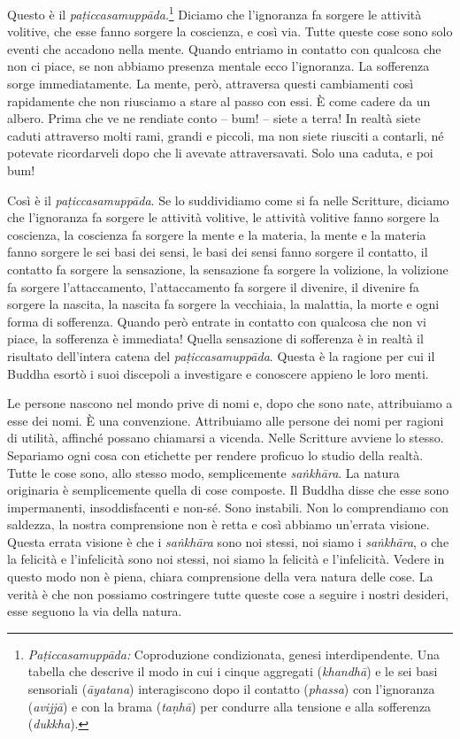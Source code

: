 Questo è il \emph{paṭiccasamuppāda}.\footnote{%
  \emph{Paṭiccasamuppāda:}
  Coproduzione condizionata, genesi interdipendente. Una tabella che
  descrive il modo in cui i cinque aggregati (\emph{khandhā}) e le sei
  basi sensoriali (\emph{āyatana}) interagiscono dopo il contatto
  (\emph{phassa}) con l'ignoranza (\emph{avijjā}) e con la brama
  (\emph{taṇhā}) per condurre alla tensione e alla sofferenza
  (\emph{dukkha}).}
Diciamo che l'ignoranza fa sorgere le attività
volitive, che esse fanno sorgere la coscienza, e così via. Tutte queste
cose sono solo eventi che accadono nella mente. Quando entriamo in
contatto con qualcosa che non ci piace, se non abbiamo presenza mentale
ecco l'ignoranza. La sofferenza sorge immediatamente. La mente, però,
attraversa questi cambiamenti così rapidamente che non riusciamo a stare
al passo con essi. È come cadere da un albero. Prima che ve ne rendiate
conto -- bum! -- siete a terra! In realtà siete caduti attraverso molti
rami, grandi e piccoli, ma non siete riusciti a contarli, né potevate
ricordarveli dopo che li avevate attraversavati. Solo una caduta, e poi
bum!

Così è il \emph{paṭiccasamuppāda}. Se lo suddividiamo come si fa nelle
Scritture, diciamo che l'ignoranza fa sorgere le attività volitive, le
attività volitive fanno sorgere la coscienza, la coscienza fa sorgere la
mente e la materia, la mente e la materia fanno sorgere le sei basi dei
sensi, le basi dei sensi fanno sorgere il contatto, il contatto fa
sorgere la sensazione, la sensazione fa sorgere la volizione, la
volizione fa sorgere l'attaccamento, l'attaccamento fa sorgere il
divenire, il divenire fa sorgere la nascita, la nascita fa sorgere la
vecchiaia, la malattia, la morte e ogni forma di sofferenza. Quando però
entrate in contatto con qualcosa che non vi piace, la sofferenza è
immediata! Quella sensazione di sofferenza è in realtà il risultato
dell'intera catena del \emph{paṭiccasamuppāda}. Questa è la ragione per
cui il Buddha esortò i suoi discepoli a investigare e conoscere appieno
le loro menti.

Le persone nascono nel mondo prive di nomi e, dopo che sono nate,
attribuiamo a esse dei nomi. È una convenzione. Attribuiamo alle persone
dei nomi per ragioni di utilità, affinché possano chiamarsi a vicenda.
Nelle Scritture avviene lo stesso. Separiamo ogni cosa con etichette per
rendere proficuo lo studio della realtà. Tutte le cose sono, allo stesso
modo, semplicemente \emph{saṅkhāra}. La natura originaria è
semplicemente quella di cose composte. Il Buddha disse che esse sono
impermanenti, insoddisfacenti e non-sé. Sono instabili. Non lo
comprendiamo con saldezza, la nostra comprensione non è retta e così
abbiamo un'errata visione. Questa errata visione è che i \emph{saṅkhāra}
sono noi stessi, noi siamo i \emph{saṅkhāra}, o che la felicità e
l'infelicità sono noi stessi, noi siamo la felicità e l'infelicità.
Vedere in questo modo non è piena, chiara comprensione della vera natura
delle cose. La verità è che non possiamo costringere tutte queste cose a
seguire i nostri desideri, esse seguono la via della natura.

